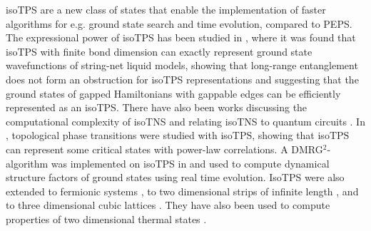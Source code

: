 isoTPS are a new class of states that enable the implementation of faster algorithms for e.g. ground state search and time evolution, compared to PEPS. The expressional power of isoTPS has been studied in \cite{cite:isometric_tensor_network_representation_of_string_net_liquids}, where it was found that isoTPS with finite bond dimension can exactly represent ground state wavefunctions of string-net liquid models, showing that long-range entanglement does not form an obstruction for isoTPS representations and suggesting that the ground states of gapped Hamiltonians with gappable edges can be efficiently represented as an isoTPS. There have also been works discussing the computational complexity of isoTNS \cite{cite:computational_complexity_of_isometric_tensor_network_states} and relating isoTNS to quantum circuits \cite{cite:sequential_generation_of_projected_entangled_pair_states, cite:quantum_circuits_for_2D_isometric_tensor_networks}. In \cite{cite:topological_quantum_phase_transitions_in_2D_isometric_tensor_networks}, topological phase transitions were studied with isoTPS, showing that isoTPS can represent some critical states with power-law correlations. A DMRG$^2$-algorithm was implemented on isoTPS in \cite{cite:efficient_simulation_of_dynamics_in_two_dimensional_quantum_spin_systems} and used to compute dynamical structure factors of ground states using real time evolution. IsoTPS were also extended to fermionic systems \cite{cite:fermionic_isometric_tensor_network_states}, to two dimensional strips of infinite length \cite{cite:two_dimensional_isometric_tensor_networks_on_infinite_strip}, and to three dimensional cubic lattices \cite{cite:three_dimensional_isometric_tensor_networks}. They have also been used to compute properties of two dimensional thermal states \cite{cite:isometric_tensor_network_representation_of_2D_thermal_states}.